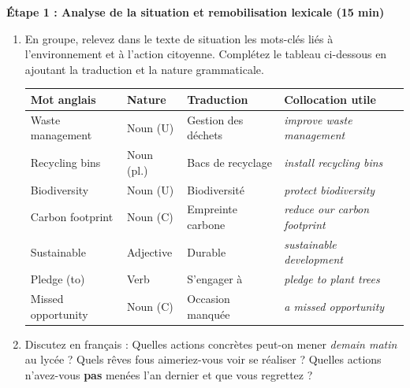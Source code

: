\documentclass[11pt]{article}
\newcommand{\eng}[1]{\ifmmode\text{\textit{#1}}\else\begingroup\selectlanguage{english}\itshape #1\endgroup\fi}
\begin{document}
\textbf{Étape 1 : Analyse de la situation et remobilisation lexicale (15 min)}\par
\begin{enumerate}
    \item En groupe, relevez dans le texte de situation les mots-clés liés à l'environnement et à l'action citoyenne. Complétez le tableau ci-dessous en ajoutant la traduction et la nature grammaticale.
    \begin{center}
    \begin{tabularx}{\linewidth}{|X|X|X|X|}
    \hline
    \rowcolor{popblueL} \textbf{Mot anglais} & \textbf{Nature} & \textbf{Traduction} & \textbf{Collocation utile} \\
    \hline
    Waste management & Noun (U) & Gestion des déchets & \eng{improve waste management} \\
    \hline
    Recycling bins & Noun (pl.) & Bacs de recyclage & \eng{install recycling bins} \\
    \hline
    Biodiversity & Noun (U) & Biodiversité & \eng{protect biodiversity} \\
    \hline
    Carbon footprint & Noun (C) & Empreinte carbone & \eng{reduce our carbon footprint} \\
    \hline
    Sustainable & Adjective & Durable & \eng{sustainable development} \\
    \hline
    Pledge (to) & Verb & S'engager à & \eng{pledge to plant trees} \\
    \hline
    Missed opportunity & Noun (C) & Occasion manquée & \eng{a missed opportunity} \\
    \hline
    \end{tabularx}
    \end{center}
    \item Discutez en français : Quelles actions concrètes peut-on mener \textit{demain matin} au lycée ? Quels rêves fous aimeriez-vous voir se réaliser ? Quelles actions n'avez-vous \textbf{pas} menées l'an dernier et que vous regrettez ?
\end{enumerate}
\end{document}
